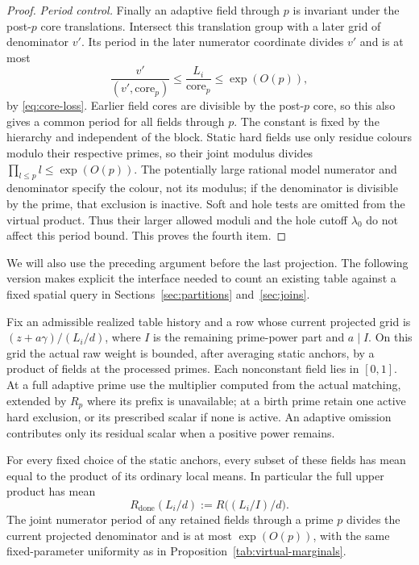 \begin{proof}
\emph{Period control.}\quad
Finally an adaptive field through $p$ is invariant under the
post-$p$ core translations.  Intersect this translation group
with a later grid of denominator $v'$.  Its period in the later
numerator coordinate divides $v'$ and is at most
\[
 \frac{v'}{(v',\mathrm{core}_p)}
 \le\frac{L_i}{\mathrm{core}_p}\le\exp(O(p)),
\]
by \eqref{eq:core-loss}.  Earlier field cores are divisible
by the post-$p$ core, so this also gives a common period for
all fields through $p$.  The constant is fixed by the hierarchy
and independent of the block.  Static hard fields use only
residue colours modulo their respective primes, so their joint
modulus divides $\prod_{l\le p}l\le\exp(O(p))$.  The potentially
large rational model numerator and denominator specify the
colour, not its modulus; if the denominator is divisible by
the prime, that exclusion is inactive.  Soft and hole tests
are omitted from the virtual product.  Thus their larger
allowed moduli and the hole cutoff $\lambda_0$ do not affect
this period bound.  This proves
the fourth item.
\end{proof}

We will also use the preceding argument before the last projection.
The following version makes explicit the interface needed to count an
existing table against a fixed spatial query in
Sections~\ref{sec:partitions} and~\ref{sec:joins}.

\begin{corollary}
\label{tab:intermediate-fields}
Fix an admissible realized table history and a row whose current
projected grid is $(z+a\gamma)/(L_i/d)$, where $I$ is the remaining
prime-power part and $a\mid I$. On this grid the actual raw weight
is bounded, after averaging static anchors, by a product of fields
at the processed primes. Each nonconstant field lies in $[0,1]$.
At a full adaptive prime use the multiplier computed from the actual
matching, extended by $R_p$ where its prefix is unavailable; at a
birth prime retain one active hard exclusion, or its prescribed scalar
if none is active. An adaptive omission contributes only its residual
scalar when a positive power remains.

For every fixed choice of the static anchors, every subset of these
fields has mean equal to the product of its ordinary local means.
In particular the full upper product has mean
\[
 R_{\mathrm{done}}(L_i/d)
 :=R\bigl((L_i/I)/d\bigr).
\]
The joint numerator period of any retained fields through a prime $p$
divides the current projected denominator and is at most $\exp(O(p))$,
with the same fixed-parameter uniformity as in
Proposition~\ref{tab:virtual-marginals}.
\end{corollary}

